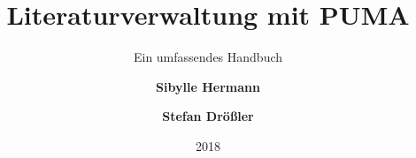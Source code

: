 \documentclass[b5paper,11pt,twoside]{scrbook} %
\begin{document}
 
    \title{\Huge Literaturverwaltung mit PUMA}
    \subtitle{\Large Ein umfassendes Handbuch}
    \author{\textbf{Sibylle Hermann}}
    \author{\textbf{Stefan Drößler}}
    \date{2018}

\maketitle
\newpage
\listoftodos
{} 
\clearpage
\tableofcontents 
\setcounter{secnumdepth}{3} 
\setcounter{tocdepth}{3} 
\newpage
{}
\pagestyle{headings}








 



\renewcommand{\indexname}{Stichwortverzeichnis}
\printindex
\end{document}
